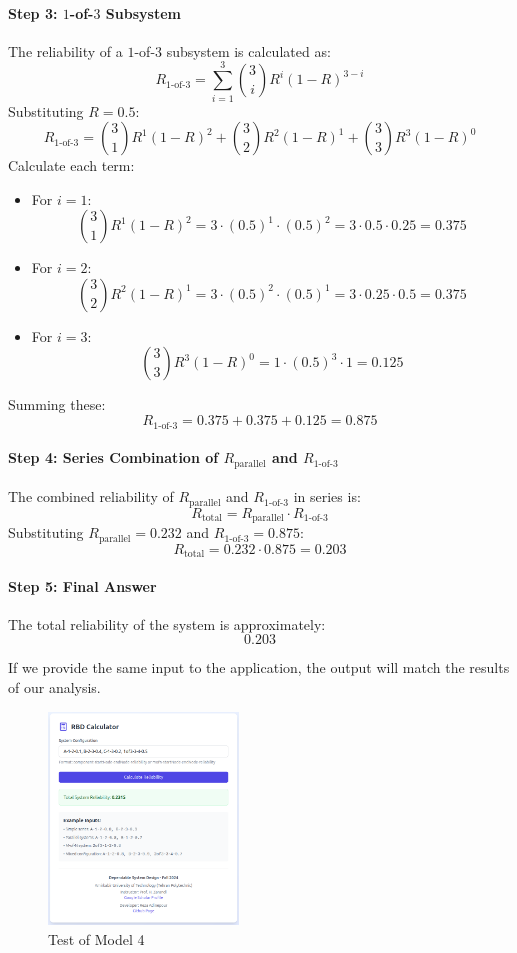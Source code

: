 \documentclass[12pt	]{article}
\begin{document}
\paragraph{Step 3: $1$-of-$3$ Subsystem}
The reliability of a $1$-of-$3$ subsystem is calculated as:
\[
R_{1\text{-of-}3} = \sum_{i=1}^3 \binom{3}{i} R^i (1 - R)^{3-i}
\]
Substituting $R = 0.5$:
\[
R_{1\text{-of-}3} = \binom{3}{1} R^1 (1 - R)^2 + \binom{3}{2} R^2 (1 - R)^1 + \binom{3}{3} R^3 (1 - R)^0
\]
Calculate each term:
\begin{itemize}
	\item For $i = 1$:
	\[
	\binom{3}{1} R^1 (1 - R)^2 = 3 \cdot (0.5)^1 \cdot (0.5)^2 = 3 \cdot 0.5 \cdot 0.25 = 0.375
	\]
	\item For $i = 2$:
	\[
	\binom{3}{2} R^2 (1 - R)^1 = 3 \cdot (0.5)^2 \cdot (0.5)^1 = 3 \cdot 0.25 \cdot 0.5 = 0.375
	\]
	\item For $i = 3$:
	\[
	\binom{3}{3} R^3 (1 - R)^0 = 1 \cdot (0.5)^3 \cdot 1 = 0.125
	\]
\end{itemize}
Summing these:
\[
R_{1\text{-of-}3} = 0.375 + 0.375 + 0.125 = 0.875
\]

\paragraph{Step 4: Series Combination of $R_{\text{parallel}}$ and $R_{1\text{-of-}3}$}
The combined reliability of $R_{\text{parallel}}$ and $R_{1\text{-of-}3}$ in series is:
\[
R_{\text{total}} = R_{\text{parallel}} \cdot R_{1\text{-of-}3}
\]
Substituting $R_{\text{parallel}} = 0.232$ and $R_{1\text{-of-}3} = 0.875$:
\[
R_{\text{total}} = 0.232 \cdot 0.875 = 0.203
\]

\paragraph{Step 5: Final Answer}
The total reliability of the system is approximately:
\[
\boxed{0.203}
\]

If we provide the same input to the application, the output will match the results of our analysis.
\newpage

\begin{figure}[h]
	\centering
	\includegraphics[width=0.45\textwidth]{Images/img6.png}
	\caption{Test of Model 4}
	\label{fig:Test of Model 4}
\end{figure}
\end{document}
